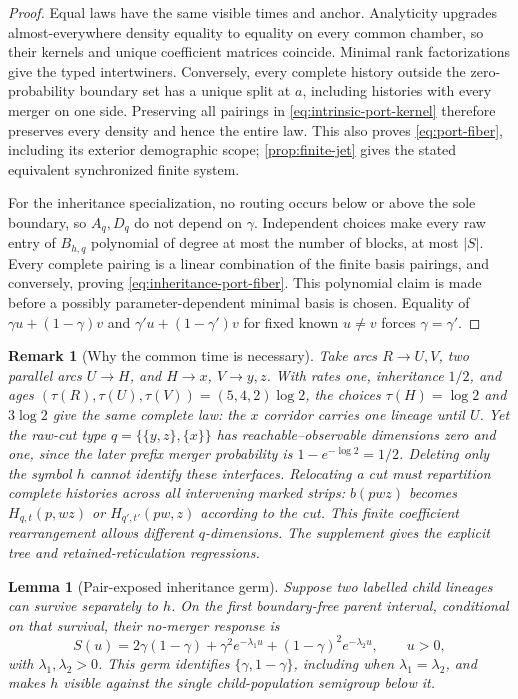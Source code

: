 \documentclass[11pt]{article}
\newtheorem{lemma}[theorem]{Lemma}
\newtheorem{remark}[theorem]{Remark}
\begin{document}
\begin{proof}
Equal laws have the same visible times and anchor.  Analyticity upgrades almost-everywhere density equality to equality on every common chamber, so their kernels and unique coefficient matrices coincide.  Minimal rank factorizations give the typed intertwiners.  Conversely, every complete history outside the zero-probability boundary set has a unique split at $a$, including histories with every merger on one side.  Preserving all pairings in \eqref{eq:intrinsic-port-kernel} therefore preserves every density and hence the entire law.  This also proves \eqref{eq:port-fiber}, including its exterior demographic scope; \cref{prop:finite-jet} gives the stated equivalent synchronized finite system.

For the inheritance specialization, no routing occurs below or above the sole boundary, so $A_q,D_q$ do not depend on $\gamma$.  Independent choices make every raw entry of $B_{h,q}$ polynomial of degree at most the number of blocks, at most $|S|$.  Every complete pairing is a linear combination of the finite basis pairings, and conversely, proving \eqref{eq:inheritance-port-fiber}.  This polynomial claim is made before a possibly parameter-dependent minimal basis is chosen.  Equality of $\gamma u+(1-\gamma)v$ and $\gamma'u+(1-\gamma')v$ for fixed known $u\ne v$ forces $\gamma=\gamma'$.
\end{proof}

\begin{remark}[Why the common time is necessary]
\label{rem:raw-cut}
Take arcs $R\to U,V$, two parallel arcs $U\to H$, and $H\to x$, $V\to y,z$.  With rates one, inheritance $1/2$, and ages $(\tau(R),\tau(U),\tau(V))=(5,4,2)\log2$, the choices $\tau(H)=\log2$ and $3\log2$ give the same complete law: the $x$ corridor carries one lineage until $U$.  Yet the raw-cut type $q=\{\{y,z\},\{x\}\}$ has reachable--observable dimensions zero and one, since the later prefix merger probability is $1-e^{-\log2}=1/2$.  Deleting only the symbol $h$ cannot identify these interfaces.  Relocating a cut must repartition complete histories across \emph{all} intervening marked strips: $b(pwz)$ becomes $H_{q,t}(p,wz)$ or $H_{q',t'}(pw,z)$ according to the cut.  This finite coefficient rearrangement allows different $q$-dimensions.  The supplement gives the explicit tree and retained-reticulation regressions.
\end{remark}

\begin{lemma}[Pair-exposed inheritance germ]
\label{lem:pair-germ}
Suppose two labelled child lineages can survive separately to $h$.  On the first boundary-free parent interval, conditional on that survival, their no-merger response is
\begin{equation}
S(u)=2\gamma(1-\gamma)
 +\gamma^2e^{-\lambda_1u}
 +(1-\gamma)^2e^{-\lambda_2u},\qquad u>0,
\label{eq:pair-port-survival}
\end{equation}
with $\lambda_1,\lambda_2>0$.  This germ identifies $\{\gamma,1-\gamma\}$, including when $\lambda_1=\lambda_2$, and makes $h$ visible against the single child-population semigroup below it.
\end{lemma}
\end{document}
